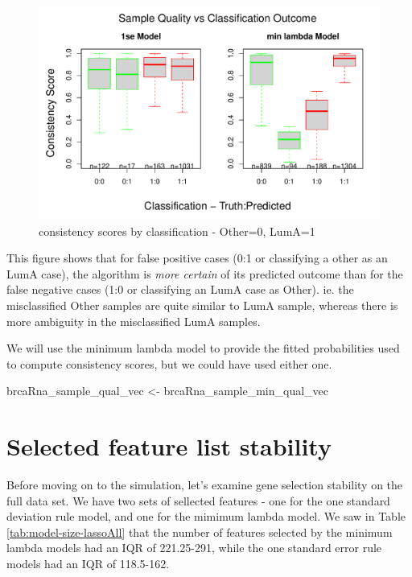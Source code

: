 \documentclass[
]{book}
\newenvironment{Shaded}{\begin{snugshade}}{\end{snugshade}}
\newcommand{\NormalTok}[1]{#1}
\newcommand{\StringTok}[1]{\textcolor[rgb]{0.31,0.60,0.02}{#1}}
\begin{document}
\begin{figure}
\centering
\includegraphics{Static/figures/brca-rnaseq-plot-qual-conf-1.pdf}
\caption{\label{fig:brca-rnaseq-plot-qual-conf}consistency scores by classification - Other=0, LumA=1}
\end{figure}

This figure shows that for false positive cases (0:1 or classifying a
other as an LumA case), the algorithm is \emph{more certain} of its predicted
outcome than for the false negative cases (1:0 or classifying an LumA case as Other).
ie. the misclassified Other samples are quite similar to LumA sample, whereas there
is more ambiguity in the misclassified LumA samples.

We will use the minimum lambda model to provide
the fitted probabilities used to compute consistency scores,
but we could have used either one.

\begin{Shaded}
\begin{Highlighting}[]
\NormalTok{brcaRna\_sample\_qual\_vec <{-}}\StringTok{ }\NormalTok{brcaRna\_sample\_min\_qual\_vec}
\end{Highlighting}
\end{Shaded}

\hypertarget{selected-feature-list-stability-1}{%
\section{Selected feature list stability}\label{selected-feature-list-stability-1}}

Before moving on to the simulation, let's examine gene selection stability on the
full data set. We have two sets of sellected features - one for the
one standard deviation rule model, and one for the mimimum lambda model.
We saw in Table \ref{tab:model-size-lassoAll} that the number of features
selected by the minimum lambda models had an IQR of
221.25-291,
while the one standard error rule models had an IQR of
118.5-162.
\end{document}
